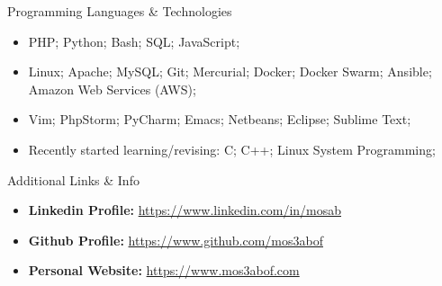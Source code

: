 \documentclass[]{mosabcv}
\begin{document}
	\begin{cvsection}{Programming Languages \& Technologies}
		\begin{cvsubsection}{}{}{}	
			\begin{itemize}
				\item PHP; Python; Bash; SQL; JavaScript;
				\item Linux; Apache; MySQL; Git; Mercurial; Docker; Docker Swarm; Ansible; Amazon Web Services (AWS);
				\item Vim; PhpStorm; PyCharm; Emacs; Netbeans; Eclipse; Sublime Text;
				\item Recently started learning/revising: C; C++; Linux System Programming;
			\end{itemize}
		\end{cvsubsection}
	\end{cvsection}
	
	\begin{cvsection}{Additional Links \& Info}
		\begin{cvsubsection}{}{}{}	
			\begin{itemize}
				\item \textbf{Linkedin Profile:} \href{https://www.linkedin.com/in/mosab}{https://www.linkedin.com/in/mosab}
				\item \textbf{Github Profile:} \href{https://www.github.com/mos3abof}{https://www.github.com/mos3abof}
				\item \textbf{Personal Website:} \href{https://www.mos3abof.com}{https://www.mos3abof.com}
			\end{itemize}
		\end{cvsubsection}
	\end{cvsection}
\end{document}
